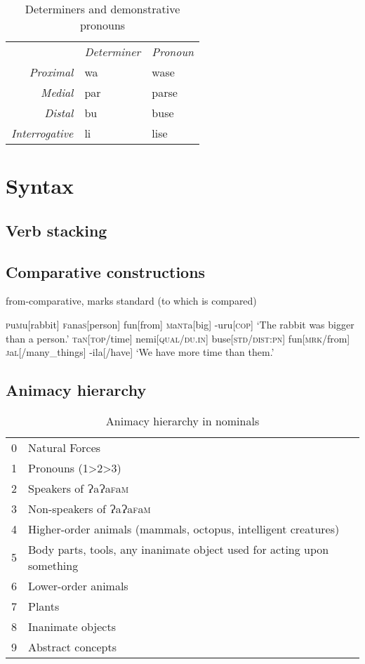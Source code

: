 \documentclass[a4paper,10pt,twoside,openright]{memoir}
\newcommand{\lang}{ɁaɁa\textsc{f}a\textsc{m}}
\begin{document}
\begin{table}[ht]
    \centering
    \begin{tabular}{>{\em}rll}
        & \textit{Determiner} & \textit{Pronoun}  \\
    Proximal & wa & wase \\
    Medial & par & parse \\
    Distal & bu & buse \\
    Interrogative & li & lise \\
    \end{tabular}
    \caption{Determiners and demonstrative pronouns}
    \label{tab:determiners}
\end{table}

\chapter{Syntax}

\section{Verb stacking}

\section{Comparative constructions}

from-comparative, marks standard (to which is compared)

\pex[interpartskip=3ex]
\a
\begingl
\textsc{p}u\textsc{m}u[rabbit]
\textsc{f}ana\textsc{s}[person]
fun[from]
\textsc{m}a\textsc{nt}a[big]
-uru[\textsc{cop}]
\glft `The rabbit was bigger than a person.'
\endgl
\a
\begingl
\textsc{t}a\textsc{n}[\textsc{top}/time]
nemi[\textsc{qual}/\textsc{du.in}]
buse[\textsc{std}/\textsc{dist:pn}]
fun[\textsc{mrk}/from]
\textsc{j}a\textsc{l}[/many\_things]
-ila[/have]
\glft `We have more time than them.'
\endgl
\xe

\section{Animacy hierarchy}

\begin{table}[ht]
    \centering
    \begin{tabular}{ll}
    0 & Natural Forces \\
    1 & Pronouns (1>2>3) \\
    2 & Speakers of \lang{} \\
    3 & Non-speakers of \lang{} \\
    4 & Higher-order animals (mammals, octopus, intelligent creatures) \\
    5 & \parbox[t]{7cm}{Body parts, tools, any inanimate object used for acting upon something} \\
    6 & Lower-order animals \\
    7 & Plants \\
    8 & Inanimate objects \\
    9 & Abstract concepts 
    \end{tabular}
    \caption{Animacy hierarchy in nominals}
    \label{tab:hierarchy}
\end{table}
\end{document}

